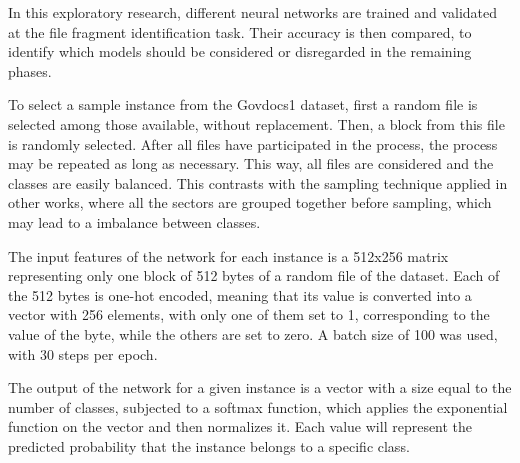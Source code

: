 \label{sec:evalmodels}

In this exploratory research, different neural networks are trained and validated
at the file fragment identification task. Their accuracy is then compared,
to identify which models should be considered or disregarded in the remaining phases.


To select a sample instance from the Govdocs1 dataset, first a random file is selected among those available, without replacement. Then, a block from this file is randomly selected. After all files have participated in the process, the process may be repeated as long as necessary. This way, all files are considered and the classes are easily balanced.
This contrasts with the sampling technique applied in other works, where all the sectors are grouped together before sampling, which may lead to a imbalance between classes.

The input features of the network for each instance is a 512x256 matrix representing only one block of 512 bytes of a random file of the dataset. Each of the 512 bytes is one-hot encoded, meaning that its value is converted into a vector with 256 elements, with only one of them set to 1, corresponding to the value of the byte, while the others are set to zero. A batch size of 100 was used, with 30 steps per epoch. 


The output of the network for a given instance is a vector with a size equal to the number of classes, subjected to a softmax function, which applies the exponential function on the vector and then normalizes it. Each value will represent the predicted probability that the instance belongs to a specific class.


